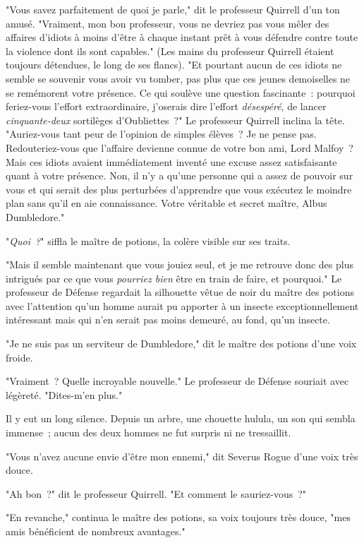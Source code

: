 "Vous savez parfaitement de quoi je parle," dit le professeur Quirrell d'un ton amusé. "Vraiment, mon bon professeur, vous ne devriez pas vous mêler des affaires d'idiots à moins d'être à chaque instant prêt à vous défendre contre toute la violence dont ils sont capables." (Les mains du professeur Quirrell étaient toujours détendues, le long de ses flancs). "Et pourtant aucun de ces idiots ne semble se souvenir vous avoir vu tomber, pas plus que ces jeunes demoiselles ne se remémorent votre présence. Ce qui soulève une question fascinante~: pourquoi feriez-vous l'effort extraordinaire, j'oserais dire l'effort \emph{désespéré}, de lancer \emph{cinquante-deux} sortilèges d'Oubliettes~?" Le professeur Quirrell inclina la tête. "Auriez-vous tant peur de l'opinion de simples élèves~? Je ne pense pas. Redouteriez-vous que l'affaire devienne connue de votre bon ami, Lord Malfoy~? Mais ces idiots avaient immédiatement inventé une excuse assez satisfaisante quant à votre présence. Non, il n'y a qu'une personne qui a assez de pouvoir sur vous et qui serait des plus perturbées d'apprendre que vous exécutez le moindre plan sans qu'il en aie connaissance. Votre véritable et secret maître, Albus Dumbledore."

"\emph{Quoi~?}" siffla le maître de potions, la colère visible sur ses traits.

"Mais il semble maintenant que vous jouiez seul, et je me retrouve donc des plus intrigués par ce que vous \emph{pourriez bien} être en train de faire, et pourquoi." Le professeur de Défense regardait la silhouette vêtue de noir du maître des potions avec l'attention qu'un homme aurait pu apporter à un insecte exceptionnellement intéressant mais qui n'en serait pas moins demeuré, au fond, qu'un insecte.

"Je ne suis pas un serviteur de Dumbledore," dit le maître des potions d'une voix froide.

"Vraiment~? Quelle incroyable nouvelle." Le professeur de Défense souriait avec légèreté. "Dites-m'en plus."

Il y eut un long silence. Depuis un arbre, une chouette hulula, un son qui sembla immense~; aucun des deux hommes ne fut surpris ni ne tressaillit.

"Vous n'avez aucune envie d'être mon ennemi," dit Severus Rogue d'une voix très douce.

"Ah bon~?" dit le professeur Quirrell. "Et comment le sauriez-vous~?"

"En revanche," continua le maître des potions, sa voix toujours très douce, "mes amis bénéficient de nombreux avantages."

